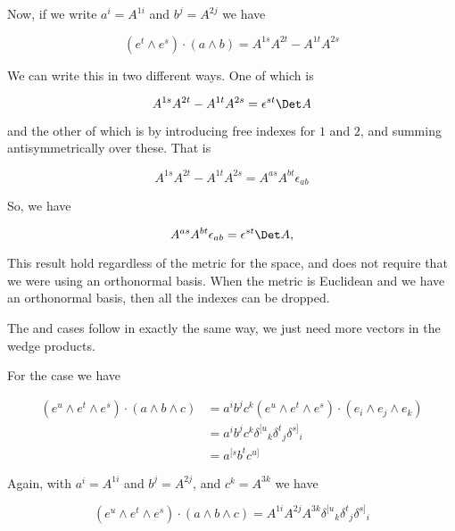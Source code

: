 Now, if we write $a^i = A^{1 i}$ and $b^j = A^{2 j}$ we have

\begin{equation}\label{eqn:relElectroDynProblemSet3:410}
(e^t \wedge e^s) \cdot (a \wedge b)
= 
A^{1 s} A^{2 t} -A^{1 t} A^{2 s}
\end{equation}

We can write this in two different ways.  One of which is

\begin{equation}\label{eqn:relElectroDynProblemSet3:430}
A^{1 s} A^{2 t} -A^{1 t} A^{2 s} =
\epsilon^{s t} \Det A
\end{equation}

and the other of which is by introducing free indexes for $1$ and $2$, and summing antisymmetrically over these.  That is

\begin{equation}\label{eqn:relElectroDynProblemSet3:450}
A^{1 s} A^{2 t} -A^{1 t} A^{2 s} 
=
A^{a s} A^{b t} \epsilon_{a b}
\end{equation}

So, we have

\begin{equation}\label{eqn:relElectroDynProblemSet3:470}
A^{a s} A^{b t} \epsilon_{a b} = \epsilon^{s t} \Det A,
\end{equation}

This result hold regardless of the metric for the space, and does not require that we were using an orthonormal basis.  When the metric is Euclidean and we have an orthonormal basis, then all the indexes can be dropped.

The  and  cases follow in exactly the same way, we just need more vectors in the wedge products.

For the  case we have

\begin{align*}
(e^u \wedge e^t \wedge e^s) \cdot ( a \wedge b \wedge c) 
&=
a^i b^j c^k 
(e^u \wedge e^t \wedge e^s) \cdot (e_i \wedge e_j \wedge e_k) \\
&=
a^i b^j c^k 
{\delta^{[u}}_k
{\delta^{t}}_j
{\delta^{s]}}_i \\
&=
a^{[s} b^t c^{u]} 
\end{align*}

Again, with $a^i = A^{1 i}$ and $b^j = A^{2 j}$, and $c^k = A^{3 k}$ we have

\begin{equation}\label{eqn:relElectroDynProblemSet3:490}
(e^u \wedge e^t \wedge e^s) \cdot ( a \wedge b \wedge c) 
=
A^{1 i} A^{2 j} A^{3 k}
{\delta^{[u}}_k
{\delta^{t}}_j
{\delta^{s]}}_i 
\end{equation}

